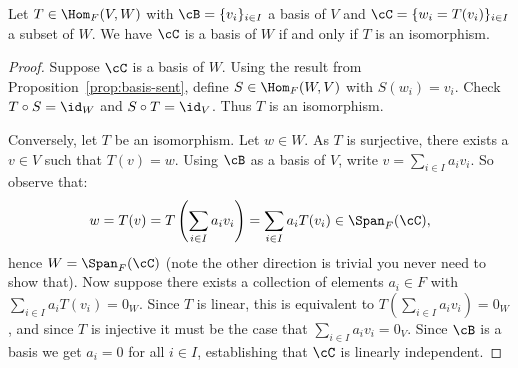     \begin{corollary}
        Let $T \in \Hom_F{(V,W)}$ with $\cB = \{v_i\}_{i \in I}$ a basis of $V$ and $\cC = \{w_i = T(v_i)\}_{i \in I}$ a subset of $W$. We have $\cC$ is a basis of $W$ if and only if $T$ is an isomorphism.
    \end{corollary}
        \begin{proof}
            Suppose $\cC$ is a basis of $W$. Using the result from Proposition~\ref{prop:basis-sent}, define $S \in \Hom_F{(W,V)}$ with $S(w_i) = v_i$. {\color{red} Check $T\circ S = \id_W$ and $S \circ T = \id_V$}. Thus $T$ is an isomorphism.

            Conversely, let $T$ be an isomorphism. Let $w \in W$. As $T$ is surjective, there exists a $v \in V$ such that $T(v) = w$. Using $\cB$ as a basis of $V$, write $v = \sum_{i \in I}a_i v_i$. So observe that:
                \begin{equation*}
                    w = T(v) = T\left(\sum_{i \in I}a_i v_i\right) = \sum_{i \in I}a_i T(v_i) \in \Span_F{(\cC)}, 
                \end{equation*} 
            hence $W = \Span_F{(\cC)}$ (note the other direction is trivial \textemdash you never need to show that). Now suppose there exists a collection of elements $a_i \in F$ with $\sum_{i \in I}a_i T(v_i) = 0_W$. Since $T$ is linear, this is equivalent to $T(\sum_{i \in I}a_i v_i) = 0_W$, and since $T$ is injective it must be the case that $\sum_{i \in I}a_i v_i = 0_V$. Since $\cB$ is a basis we get $a_i = 0$ for all $i \in I$, establishing that $\cC$ is linearly independent.
        \end{proof}

